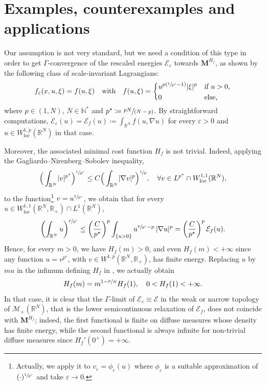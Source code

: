 \documentclass[JEP,XML,SOM,Unicode,published]{cedram}
\newcommand{\spfrac}[2]{{\sfrac{#1}{(#2)}}}
\theoremstyle{plain}
\theoremstyle{definition}
\newcommand{\N}{\mathbb{N}}
\newcommand{\R}{\mathbb{R}}
\newcommand{\Mspace}{\mathscr{M}}
\newcommand{\ener}{\mathcal{E}}
\newcommand{\mass}{\boldsymbol{M}}
\newcommand{\loc}{\mathrm{loc}}
\newcommand{\eps}{\varepsilon}
\DeclarePairedDelimiter{\abs}{\lvert}{\rvert}
\begin{document}
\section{Examples, counterexamples and applications}\label{sectionExamples}

\label{sectionCounterExamples}

Our assumption  is not very standard, but we need a condition of this type in order to get \(\Gamma\)-convergence of the rescaled energies \(\ener_\eps\) towards \(\mass^{H_f}\), as shown by the following class of scale-invariant Lagrangians:
\begin{equation}
\label{gagliardoExample}
f_\eps(x,u,\xi)= f(u,\xi)
\quad \text{with}\quad
f(u,\xi)= \begin{dcases*}
u^{p(\sfrac{1}{p^\star}-1)}\abs{\xi}^p& if $u> 0$,\\
0& else, \end{dcases*}
\end{equation}
where \(p\in (1,N)\), \(N\in\N^\ast\) and $p^\star\coloneqq\spfrac{pN}{N-p}$. By straightforward computations, \(\ener_\eps(u)= \ener_f(u)\coloneqq \int_{\R^N}f(u,\nabla u)\) for every \(\eps>0\) and \(u\in W^{1,p}_\loc(\R^N)\) in that case.

Moreover, the associated minimal cost function \(H_f\) is not trivial. Indeed, applying the Gagliardo--Nirenberg--Sobolev inequality,
\[
\Big(\int_{\R^N}\abs{v}^{p^\star}\Big)^{\sfrac{1}{p^\star}}\leq
C\Big(\int_{\R^N}\abs{\nabla v}^p\Big)^{\sfrac{1}{p}},\quad\forall v\in L^{p^\star} \cap W^{1,1}_\loc(\R^N),
\]
to the function\footnote{Actually, we apply it to $v_\eps = \phi_\eps(u)$ where $\phi_\eps$ is a suitable approximation of $(\cdot)^{\sfrac 1{p^\star}}$ and take $\eps\to 0$.} \(v=u^{\sfrac{1}{p^\star}}\), we obtain that for every \(u\in W^{1,1}_\loc(\R^N,\R_+)\cap L^1(\R^N)\),
\[
\left(\int_{\R^N}u\right)^{\sfrac{p}{p^\star}}\leq \left(\frac{C}{p^\star}\right)^p \int_{\{u>0\}}u^{\sfrac{p}{p^\star}-p}\,\abs{\nabla u}^p=\left(\frac{C}{p^\star}\right)^p\ener_f(u).
\]
Hence, for every \(m>0\), we have \(H_f(m)>0\), and even \(H_f(m)<+\infty\) since any function \(u=v^{p^\star}\), with \(v\in W^{1,p}(\R^N,\R_+)\), has finite energy. Replacing \(u\) by \(mu\) in the infimum defining \(H_f\) in , we actually obtain
\begin{equation}
\label{gagliardoHmass}
H_f(m)=m^{1-\sfrac{p}{N}}H_f(1),\quad 0<H_f(1)<+\infty.
\end{equation}
In that case, it is clear that the \(\Gamma\)-limit of \(\ener_\eps\equiv\ener\) in the weak or narrow topology of \(\Mspace_+(\R^N)\), that is the lower semicontinuous relaxation of \(\ener_f\), does not coincide with \(\mass^{H_f}\); indeed, the first functional is finite on diffuse measures whose density has finite energy, while the second functional is always infinite for non-trivial diffuse measures since \(H_f'(0^+)=+\infty\).
\end{document}
